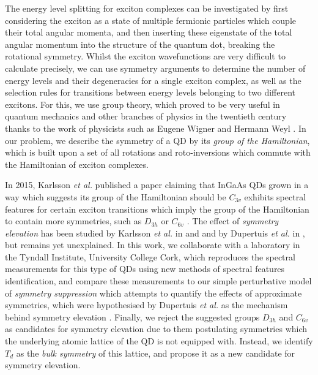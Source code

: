 \documentclass[12pt]{article}
\begin{document}
The energy level splitting for exciton complexes can be investigated by first considering the exciton as a state of multiple fermionic particles which couple their total angular momenta, and then inserting these eigenstate of the total angular momentum into the structure of the quantum dot, breaking the rotational symmetry. Whilst the exciton wavefunctions are very difficult to calculate precisely, we can use symmetry arguments to determine the number of energy levels and their degeneracies for a single exciton complex, as well as the selection rules for transitions between energy levels belonging to two different excitons. For this, we use group theory, which proved to be very useful in quantum mechanics and other branches of physics in the twentieth century thanks to the work of physicists such as Eugene Wigner and Hermann Weyl \cite{wightman}. In our problem, we describe the symmetry of a QD by its \textit{group of the Hamiltonian}, which is built upon a set of all rotations and roto-inversions which commute with the Hamiltonian of exciton complexes.

In 2015, Karlsson \textit{et al.} published a paper claiming that InGaAs QDs grown in a way which suggests its group of the Hamiltonian should be $C_{3v}$ exhibits spectral features for certain exciton transitions which imply the group of the Hamiltonian to contain more symmetries, such as $D_{3h}$ or $C_{6v}$ \cite{karlsson}. The effect of \textit{symmetry elevation} has been studied by Karlsson \textit{et al.} in \cite{karlsson} and \cite{karlsson_2010} and by Dupertuis \textit{et al.} in \cite{dupertuis}, but remains yet unexplained. In this work, we collaborate with a laboratory in the Tyndall Institute, University College Cork, which reproduces the spectral measurements for this type of QDs using new methods of spectral features identification, and compare these measurements to our simple perturbative model of \textit{symmetry suppression} which attempts to quantify the effects of approximate symmetries, which were hypothesised by Dupertuis \textit{et al.} as the mechanism behind symmetry elevation \cite[p. 2]{dupertuis}. Finally, we reject the suggested groups $D_{3h}$ and $C_{6v}$ as candidates for symmetry elevation due to them postulating symmetries which the underlying atomic lattice of the QD is not equipped with. Instead, we identify $T_d$ as the \textit{bulk symmetry} of this lattice, and propose it as a new candidate for symmetry elevation.
\end{document}
